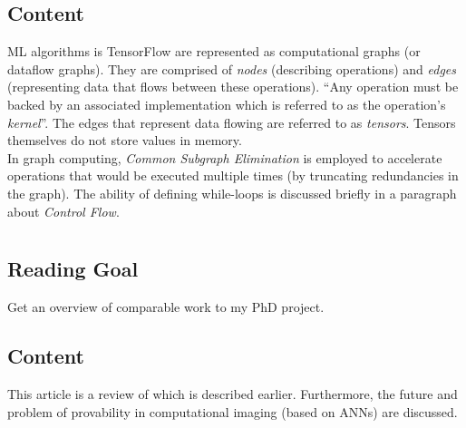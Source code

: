 \documentclass{article}
\newcommand{\newcite}[1] {\section{\cite{#1} \citenum{#1}}}
\begin{document}
\subsection*{Content}
ML algorithms is TensorFlow are represented as computational graphs (or dataflow graphs). They are comprised of \textit{nodes} (describing operations) and \textit{edges} (representing data that flows between these operations).
``Any operation must be backed by an associated implementation which is referred to as the operation's \textit{kernel}''.
The edges that represent data flowing are referred to as \textit{tensors}. Tensors themselves do not store values in memory.\\
In graph computing, \textit{Common Subgraph Elimination} is employed to accelerate operations that would be executed multiple times (by truncating redundancies in the graph). The ability of defining while-loops is discussed briefly in a paragraph about \textit{Control Flow}.


\newcite{Waller2015-ec}
\subsection*{Reading Goal}
Get an overview of comparable work to my PhD project.

\subsection*{Content}
This article is a review of \cite{Kamilov2015-lp} which is described earlier. Furthermore, the future and problem of provability in computational imaging (based on ANNs) are discussed.

\printbibliography
\end{document}
